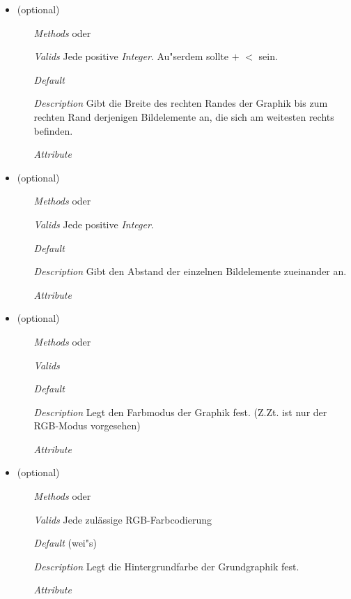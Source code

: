 \begin{description}
\begin{itemize}
\item {} (optional)
\begin{enumerate}
\item[\textit{Methods}] 
  oder 
\item[\textit{Valids}] Jede positive \textit{Integer}. Au"serdem
  sollte  $+$  $<$
   sein.
\item[\textit{Default}] 
\item[\textit{Description}] Gibt die Breite des rechten Randes der
  Graphik bis zum rechten Rand derjenigen Bildelemente an, die sich am
  weitesten rechts befinden.
\item[\textit{Attribute}] 
\end{enumerate}

\item {} (optional)
\begin{enumerate}
\item[\textit{Methods}]   oder
\item[\textit{Valids}] Jede positive \textit{Integer}.
\item[\textit{Default}] 
\item[\textit{Description}] Gibt den Abstand der einzelnen
  Bildelemente zueinander an.
\item[\textit{Attribute}] 
\end{enumerate}

\item {} (optional)
\begin{enumerate}
\item[\textit{Methods}]   oder 
\item[\textit{Valids}] 
\item[\textit{Default}] 
\item[\textit{Description}] Legt den Farbmodus der Graphik fest.
  (Z.Zt. ist nur der RGB-Modus vorgesehen)
\item[\textit{Attribute}] 
\end{enumerate}

\item {} (optional)
\begin{enumerate}
\item[\textit{Methods}] 
  oder 
\item[\textit{Valids}] Jede zul\"assige RGB-Farbcodierung
\item[\textit{Default}]  (wei"s)
\item[\textit{Description}] Legt die Hintergrundfarbe der Grundgraphik
  fest.
\item[\textit{Attribute}] 
\end{enumerate}


\end{itemize}
\end{description}
